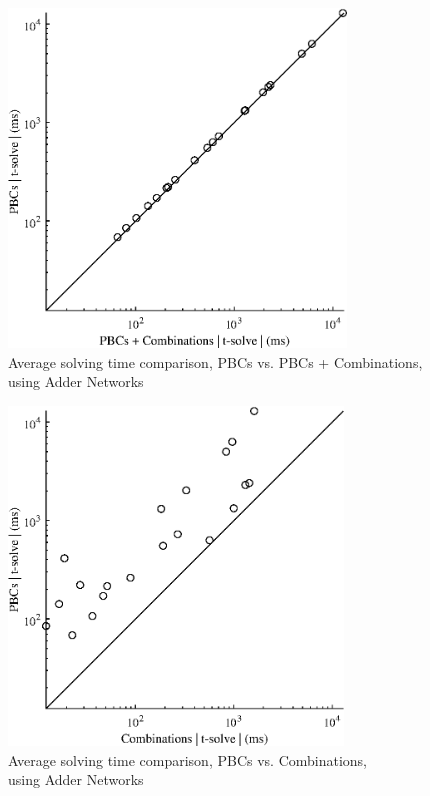{\begin{figure}
    \centering
    \includegraphics[height = 90mm]{Figures/opt_solve_2_1.eps}
    \captionsetup{justification=centering,margin=0cm}
    \caption{Average solving time comparison, PBCs vs. PBCs + Combinations,\\ using Adder Networks}
    \label{opt_solve_2_1}
\end{figure}

\begin{figure}
    \centering
    \includegraphics[height = 90mm]{Figures/opt_solve_3_1.eps}
    \captionsetup{justification=centering,margin=0cm}
    \caption{Average solving time comparison, PBCs vs. Combinations,\\ using Adder Networks}
    \label{opt_solve_3_1}
\end{figure}
}
\FloatBarrier

